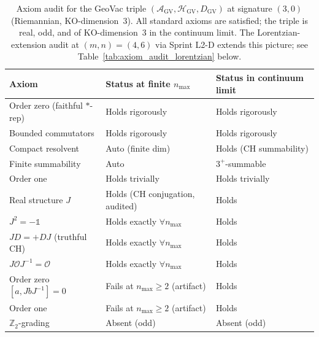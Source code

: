 \documentclass[11pt]{article}
\begin{document}
\begin{table}[h]
\centering
\begin{tabular}{lll}
\toprule
Axiom & Status at finite $n_{\max}$ & Status in continuum limit \\
\midrule
Order zero (faithful $*$-rep) & Holds rigorously & Holds rigorously \\
Bounded commutators           & Holds rigorously & Holds rigorously \\
Compact resolvent             & Auto (finite dim) & Holds (CH summability) \\
Finite summability            & Auto              & $3^+$-summable \\
Order one                     & Holds trivially   & Holds trivially \\
Real structure $J$            & Holds (CH conjugation, audited) & Holds \\
$J^2 = -\mathbb{1}$           & Holds exactly $\forall n_{\max}$ & Holds \\
$JD = +DJ$ (truthful CH)      & Holds exactly $\forall n_{\max}$ & Holds \\
$J \mathcal{O} J^{-1} = \mathcal{O}$  & Holds exactly $\forall n_{\max}$ & Holds \\
Order zero $[a, JbJ^{-1}]=0$  & Fails at $n_{\max}\ge 2$ (artifact) & Holds \\
Order one                     & Fails at $n_{\max}\ge 2$ (artifact) & Holds \\
$\mathbb{Z}_2$-grading        & Absent (odd)      & Absent (odd) \\
\bottomrule
\end{tabular}
\caption{Axiom audit for the GeoVac triple
$(\mathcal{A}_{\mathrm{GV}}, \mathcal{H}_{\mathrm{GV}}, D_{\mathrm{GV}})$
at signature $(3, 0)$ (Riemannian, KO-dimension~$3$).
All standard axioms are satisfied; the triple is real, odd, and of
$\mathrm{KO}$-dimension~$3$ in the continuum limit.  The
Lorentzian-extension audit at $(m, n) = (4, 6)$ via Sprint L2-D
extends this picture; see Table~\ref{tab:axiom_audit_lorentzian}
below.}
\label{tab:axiom_audit}
\end{table}
\end{document}
